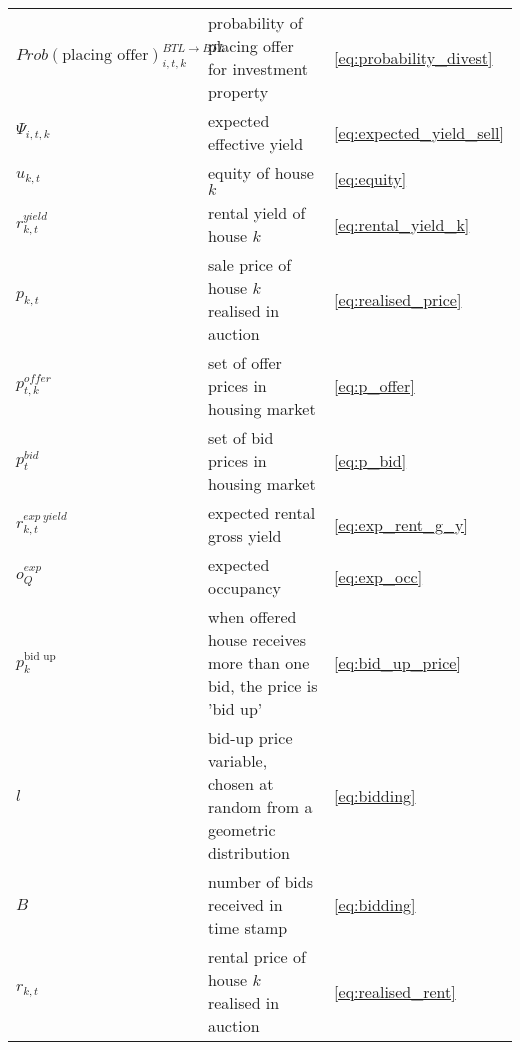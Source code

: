 \documentclass[]{article}
\begin{document}
\begin{longtable}{p{4cm} p{7cm}p{1cm}}
	
	$Prob(\text{placing offer})^{BTL\rightarrow BTL}_{i,t,k}$&probability of placing offer for investment property&\eqref{eq:probability_divest}\\
	 
	$\Psi_{i,t,k}$&expected effective yield&\eqref{eq:expected_yield_sell}\\
	
	$u_{k, t}$& equity of house $k$&\eqref{eq:equity}\\
	
	$r^{yield}_{k,t}$&rental yield of house $k$&\eqref{eq:rental_yield_k}\\
	
	$p_{k,t}$& sale price of house $k$ realised in auction&\eqref{eq:realised_price}\\
	
	$p^{offer}_{t,k}$& set of offer prices in housing market&\eqref{eq:p_offer}\\
	
	$p^{bid}_{t}$& set of bid prices in housing market&\eqref{eq:p_bid}\\
	
	$r^{exp\ yield}_{k,t}$&expected rental gross yield&\eqref{eq:exp_rent_g_y}\\
	
	$o^{exp}_{Q}$&expected occupancy&\eqref{eq:exp_occ}\\
	
	$p^{\text{bid up}}_{k}$& when offered house receives more than one bid, the price is 'bid up'& \eqref{eq:bid_up_price}\\	

	$l$& bid-up price variable, chosen at random from a geometric distribution & \eqref{eq:bidding}\\
	
	$B$& number of bids received in time stamp& \eqref{eq:bidding}\\
	
	$r_{k,t}$& rental price of house $k$ realised in auction&\eqref{eq:realised_rent}\\
	
		 
\end{longtable} 
\end{document}
